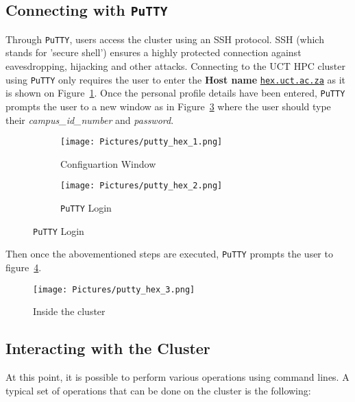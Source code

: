 \subsection*{Connecting with \texttt{PuTTY}}
Through \texttt{PuTTY}, users access the cluster using an SSH protocol. SSH (which stands for 'secure shell') ensures a highly protected connection against eavesdropping, hijacking and other attacks. Connecting to the UCT HPC cluster using \texttt{PuTTY} only requires the user to enter the \textbf{Host name} \href{http://hex.uct.ac.za/}{\texttt{hex.uct.ac.za}} as it is shown on Figure~\ref{fig:Configuartion Window}. Once the personal profile details have been entered, \texttt{PuTTY} prompts the user to a new window as in Figure~\ref{fig:PuTTY Login} where the user should type their \textit{campus\_id\_number} and \textit{password}.
\begin{figure}[ht]
  \centering
    \begin{subfigure}{\textwidth}
                    \texttt{[image: Pictures/putty\_hex\_1.png]}
                    \caption[Configuartion Window]{Configuartion Window}
                    \label{fig:Configuartion Window}
     \end{subfigure}
     \begin{subfigure}{\textwidth}
         \texttt{[image: Pictures/putty\_hex\_2.png]}
         \caption[\texttt{PuTTY} Login]{\texttt{PuTTY} Login}
          \label{fig:PuTTY Login}
     \end{subfigure}
\end{figure}
Then once the abovementioned steps are executed, \texttt{PuTTY} prompts the user to figure~\ref{fig:Inside the cluster}. 

\begin{figure}[ht]
  \centering
    \texttt{[image: Pictures/putty\_hex\_3.png]}
  \caption[Inside the cluster]{Inside the cluster}
  \label{fig:Inside the cluster}
\end{figure}


\subsection{Interacting with the Cluster}
At this point, it is possible to perform various operations using command lines. A typical set of operations that can be done on the cluster is the following:

